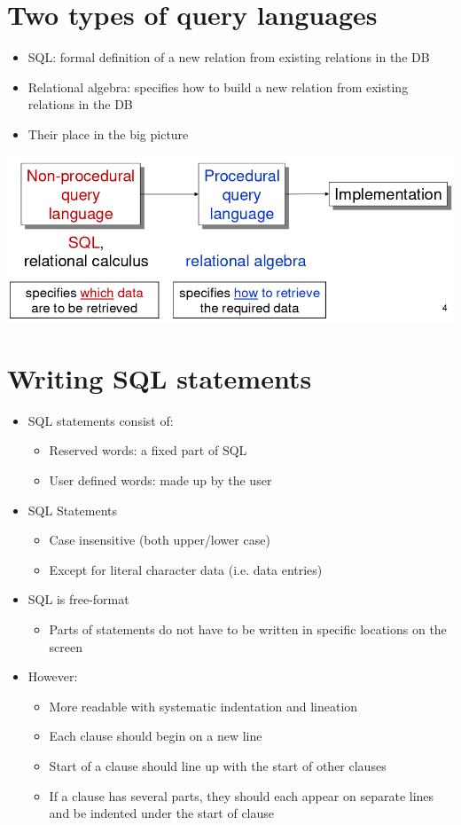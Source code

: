 \documentclass{article}[18pt]
\begin{document}
\section{Two types of query languages}
\begin{itemize}
	\item SQL: formal definition of a new relation from existing relations in the DB
	\item Relational algebra: specifies how to build a new relation from existing relations in the DB
	\item Their place in the big picture
\end{itemize}
\includegraphics[scale=0.7]{overview}
\section{Writing SQL statements}
\begin{itemize}
	\item SQL statements consist of:
	\begin{itemize}
		\item Reserved words: a fixed part of SQL
		\item User defined words: made up by the user
	\end{itemize}
	\item SQL Statements
	\begin{itemize}
		\item Case insensitive (both upper/lower case)
		\item Except for literal character data (i.e. data entries)
	\end{itemize}
	\item SQL is free-format
	\begin{itemize}
		\item Parts of statements do not have to be written in specific locations on the screen
	\end{itemize}
	\item However:
	\begin{itemize}
		\item More readable with systematic indentation and lineation
		\item Each clause should begin on a new line
		\item Start of a clause should line up with the start of other clauses
		\item If a clause has several parts, they should each appear on separate lines and be indented under the start of clause
	\end{itemize}
\end{itemize}
\end{document}
